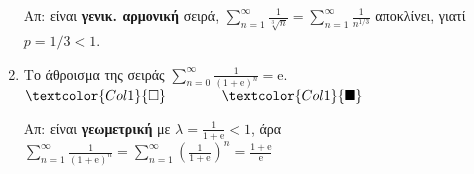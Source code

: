 \begin{enumerate}[itemsep=.5\baselineskip]
    Απ: είναι \textbf{γενικ. αρμονική} σειρά, $ \sum_{n=1}^{\infty} 
    \frac{1}{\sqrt[3]{n}} = \sum_{n=1}^{\infty} \frac{1}{n^{1/3}} $ 
    αποκλίνει, γιατί $ p=1/3 < 1 $.

  \item \textcolor{Col1}{Το άθροισμα της σειράς $ \sum_{n=0}^{\infty}
    \frac{1}{(1+ \mathrm{e})^{n}} = \mathrm{e} $}.
    \hfill $\textcolor{Col1}{\square} \qquad \qquad \textcolor{Col1}{\blacksquare}$

    Απ: είναι \textbf{γεωμετρική} με $ \lambda = \frac{1}{1+ \mathrm{e}} < 1 
    $, άρα  $ \sum_{n=1}^{\infty} \frac{1}{(1+ \mathrm{e})^{n}} = \sum_{n=1}^{\infty}
    \left(\frac{1}{1+ \mathrm{e}}\right)^{n} = \frac{1+ \mathrm{e}}{\mathrm{e}} $

    

\end{enumerate}


